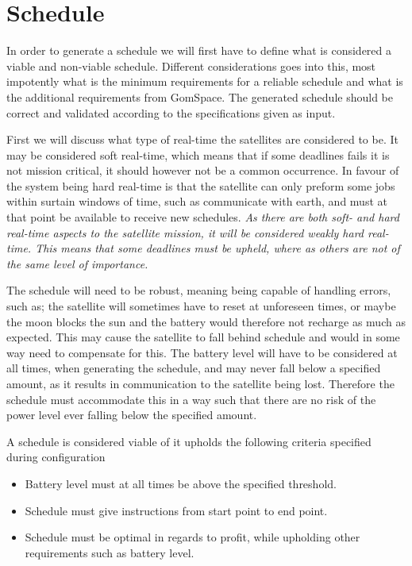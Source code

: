 \section{Schedule}
In order to generate a schedule we will first have to define what is considered a viable and non-viable schedule. Different considerations goes into this, most impotently what is the minimum requirements for a reliable schedule and what is the additional requirements from GomSpace. The generated schedule should be correct and validated according to the specifications given as input. 

First we will discuss what type of real-time the satellites are considered to be. It may be considered soft real-time, which means that if some deadlines fails it is not mission critical, it should however not be a common occurrence. In favour of the system being hard real-time is that the satellite can only preform some jobs within surtain windows of time, such as communicate with earth, and must at that point be available to receive new schedules. \textit{As there are both soft- and hard real-time aspects to the satellite mission, it will be considered weakly hard real-time. This means that some deadlines must be upheld, where as others are not of the same level of importance.}

The schedule will need to be robust, meaning being capable of handling errors, such as; the satellite will sometimes have to reset at unforeseen times, or maybe the moon blocks the sun and the battery would therefore not recharge as much as expected. This may cause the satellite to fall behind schedule and would in some way need to compensate for this.
The battery level will have to be considered at all times, when generating the schedule, and may never fall below a specified amount, as it results in communication to the satellite being lost.
Therefore the schedule must accommodate this in a way such that there are no risk of the power level ever falling below the specified amount. 

A schedule is considered viable of it upholds the following criteria specified during configuration 
\begin{itemize}
	\item Battery level must at all times be above the specified threshold.
	\item Schedule must give instructions from start point to end point.
	\item Schedule must be optimal in regards to profit, while upholding other requirements such as battery level.
\end{itemize}


